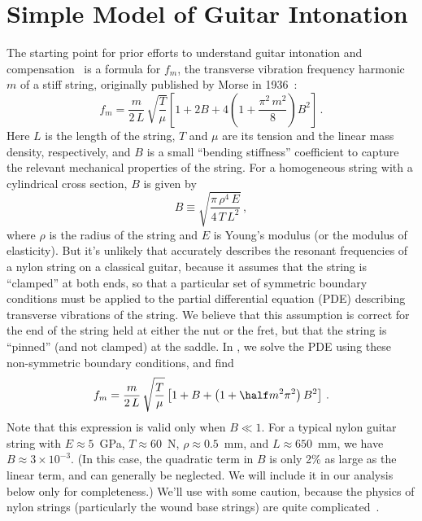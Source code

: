 %
%
%

 \section{Simple Model of Guitar Intonation\label{sct:model}}
The starting point for prior efforts to understand guitar intonation and compensation~\cite{ref:byers1996cgi,ref:varieschi2010icf} is a formula for $f_{m}$, the transverse vibration frequency harmonic $m$ of a stiff string, originally published by Morse in 1936~\cite{ref:morse1981vsb}:
 \begin{equation}\label{eqn:f_m_clamped}
f_{m} = \frac{m}{2\, L}\, \sqrt{\frac{T}{\mu}} \left[ 1 + 2 B + 4 \left(1 + \frac{\pi^2\, m^2}{8}\right) B^2 \right]\, .
 \end{equation}
Here $L$ is the length of the string, $T$ and $\mu$ are its tension and the linear mass density, respectively, and $B$ is a small ``bending stiffness'' coefficient to capture the relevant mechanical properties of the string. For a homogeneous string with a cylindrical cross section, $B$ is given by
 \begin{equation} \label{eqn:b_def}
B \equiv \sqrt{\frac{\pi\, \rho^4\, E}{4\, T\, L^2}}\, ,
 \end{equation}
where $\rho$ is the radius of the string and $E$ is Young's modulus (or the modulus of elasticity). But it's unlikely that  accurately describes the resonant frequencies of a nylon string on a classical guitar, because it assumes that the string is ``clamped'' at both ends, so that a particular set of symmetric boundary conditions must be applied to the partial differential equation (PDE) describing transverse vibrations of the string. We believe that this assumption is correct for the end of the string held at either the nut or the fret, but that the string is ``pinned'' (and not clamped) at the saddle. In , we solve the PDE using these non-symmetric boundary conditions, and find
 \begin{equation} \label{eqn:f_m_stiff}
f_m = \frac{m}{2\, L}\, \sqrt{\frac{T}{\mu}} \left[ 1 + B + \left( 1 + \half m^2 \pi^2 \right) B^2 \right]\, .
 \end{equation}
Note that this expression is valid only when $B \ll 1$. For a typical nylon guitar string with $E \approx 5$~GPa, $T \approx 60$~N, $\rho \approx 0.5$~mm, and $L \approx 650$~mm, we have $B \approx 3 \times 10^{-3}$. (In this case, the quadratic term in $B$ is only 2\% as large as the linear term, and can generally be neglected. We will include it in our analysis below only for completeness.) We'll use  with some caution, because the physics of nylon strings (particularly the wound base strings) are quite complicated~\cite{ref:lynchaird2017mpn}.

